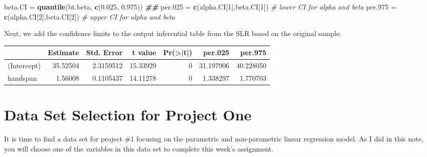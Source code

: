 \documentclass[
]{book}
\newenvironment{Shaded}{\begin{snugshade}}{\end{snugshade}}
\newcommand{\CommentTok}[1]{\textcolor[rgb]{0.56,0.35,0.01}{\textit{#1}}}
\newcommand{\DecValTok}[1]{\textcolor[rgb]{0.00,0.00,0.81}{#1}}
\newcommand{\DocumentationTok}[1]{\textcolor[rgb]{0.56,0.35,0.01}{\textbf{\textit{#1}}}}
\newcommand{\FloatTok}[1]{\textcolor[rgb]{0.00,0.00,0.81}{#1}}
\newcommand{\FunctionTok}[1]{\textcolor[rgb]{0.13,0.29,0.53}{\textbf{#1}}}
\newcommand{\NormalTok}[1]{#1}
\newcommand{\OtherTok}[1]{\textcolor[rgb]{0.56,0.35,0.01}{#1}}
\newcommand{\SpecialCharTok}[1]{\textcolor[rgb]{0.81,0.36,0.00}{\textbf{#1}}}
\begin{document}
\begin{Shaded}
\begin{Highlighting}[]
\NormalTok{beta.CI }\OtherTok{=} \FunctionTok{quantile}\NormalTok{(bt.beta, }\FunctionTok{c}\NormalTok{(}\FloatTok{0.025}\NormalTok{, }\FloatTok{0.975}\NormalTok{))}
\DocumentationTok{\#\#}
\NormalTok{per}\FloatTok{.025} \OtherTok{=} \FunctionTok{c}\NormalTok{(alpha.CI[}\DecValTok{1}\NormalTok{],beta.CI[}\DecValTok{1}\NormalTok{])     }\CommentTok{\# lower CI for alpha and beta}
\NormalTok{per}\FloatTok{.975} \OtherTok{=} \FunctionTok{c}\NormalTok{(alpha.CI[}\DecValTok{2}\NormalTok{],beta.CI[}\DecValTok{2}\NormalTok{])     }\CommentTok{\# upper CI for alpha and beta  }
\end{Highlighting}
\end{Shaded}

Next, we add the confidence limits to the output inferential table from the SLR based on the original sample.

\begin{Shaded}
\end{Shaded}

\begin{tabular}{l|r|r|r|r|r|r}
\hline
  & Estimate & Std. Error & t value & Pr(>|t|) & per.025 & per.975\\
\hline
(Intercept) & 35.52504 & 2.3159512 & 15.33929 & 0 & 31.197906 & 40.228050\\
\hline
handspan & 1.56008 & 0.1105437 & 14.11278 & 0 & 1.338297 & 1.770703\\
\hline
\end{tabular}

\hypertarget{data-set-selection-for-project-one}{%
\section{Data Set Selection for Project One}\label{data-set-selection-for-project-one}}

It is time to find a data set for project \#1 focusing on the parametric and non-parametric linear regression model. As I did in this note, you will choose one of the variables in this data set to complete this week's assignment.
\end{document}
